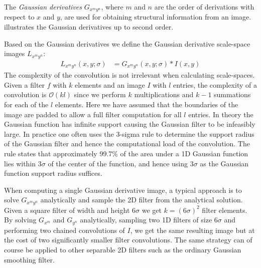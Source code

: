\documentclass[thesis.tex]{subfiles}
\begin{document}
The \emph{Gaussian derivatives} $G_{x^m y^n}$, where $m$ and $n$ are the order of derivations with respect to $x$ and $y$, are used for obtaining structural information from an image.  illustrates the Gaussian derivatives up to second order.

Based on the Gaussian derivatives we define the Gaussian derivative scale-space images $L_{x^m y^n}$:
\begin{align}
	L_{x^m y^n}(x,y;\sigma) &= G_{x^m y^n}(x,y;\sigma) \ast I(x,y)
\end{align}
%
The complexity of the convolution is not irrelevant when calculating scale-spaces. Given a filter $f$ with $k$ elements and an image $I$ with $l$ entries, the complexity of a convolution is $\mathcal{O}(k l)$ since we perform $k$ multiplications and $k-1$ summations for each of the $l$ elements. Here we have assumed that the boundaries of the image are padded to allow a full filter computation for all $l$ entries.
In theory the Gaussian function has infinite support causing the Gaussian filter to be infeasibly large. In practice one often uses the 3-sigma rule to determine the support radius of the Gaussian filter and hence the computational load of the convolution. The rule states that approximately 99.7\% of the area under a 1D Gaussian function lies within 3$\sigma$ of the center of the function, and hence using $3\sigma$ as the Gaussian function support radius suffices.

When computing a single Gaussian derivative image, a typical approach is to solve $G_{x^m y^n}$ analytically and sample the 2D filter from the analytical solution. Given a square filter of width and height $6\sigma$ we get $k=(6\sigma)^2$ filter elements. By solving $G_{x^m}$ and $G_{y^n}$ analytically, sampling two 1D filters of size $6\sigma$ and performing two chained convolutions of $I$, we get the same resulting image but at the cost of two significantly smaller filter convolutions. The same strategy can of course be applied to other separable 2D filters such as the ordinary Gaussian smoothing filter.
\end{document}
